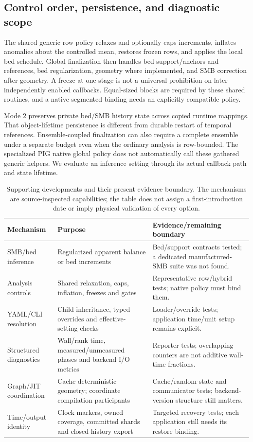 \documentclass[11pt,a4paper]{article}
\begin{document}
\subsection{Control order, persistence, and diagnostic scope}
The shared generic row policy relaxes and optionally caps increments, inflates anomalies about the controlled mean, restores frozen rows, and applies the local bed schedule. Global finalization then handles bed support/anchors and references, bed regularization, geometry where implemented, and SMB correction after geometry. A freeze at one stage is not a universal prohibition on later independently enabled callbacks. Equal-sized blocks are required by these shared routines, and a native segmented binding needs an explicitly compatible policy.

Mode 2 preserves private bed/SMB history state across copied runtime mappings. That object-lifetime persistence is different from durable restart of temporal references. Ensemble-coupled finalization can also require a complete ensemble under a separate budget even when the ordinary analysis is row-bounded. The specialized PIG native global policy does not automatically call these gathered generic helpers. We evaluate an inference setting through its actual callback path and state lifetime.

\begin{table}[htbp]\centering\small
\caption{Supporting developments and their present evidence boundary. The mechanisms are source-inspected capabilities; the table does not assign a first-introduction date or imply physical validation of every option.}\label{tab:developments}
\begin{tabular}{p{.28\linewidth}p{.32\linewidth}p{.31\linewidth}}\toprule
Mechanism & Purpose & Evidence/remaining boundary\\\midrule
SMB/bed inference & Regularized apparent balance or bed increments & Bed/support contracts tested; a dedicated manufactured-SMB suite was not found.\\
Analysis controls & Shared relaxation, caps, inflation, freezes and gates & Representative row/hybrid tests; native policy must bind them.\\
YAML/CLI resolution & Child inheritance, typed overrides and effective-setting checks & Loader/override tests; application time/unit setup remains explicit.\\
Structured diagnostics & Wall/rank time, measured/unmeasured phases and backend I/O metrics & Reporter tests; overlapping counters are not additive wall-time fractions.\\
Graph/JIT coordination & Cache deterministic geometry; coordinate compilation participants & Cache/random-state and communicator tests; backend-version structure still matters.\\
Time/output identity & Clock markers, owned coverage, committed shards and closed-history export & Targeted recovery tests; each application still needs its restore binding.\\\bottomrule
\end{tabular}
\end{table}
\end{document}
